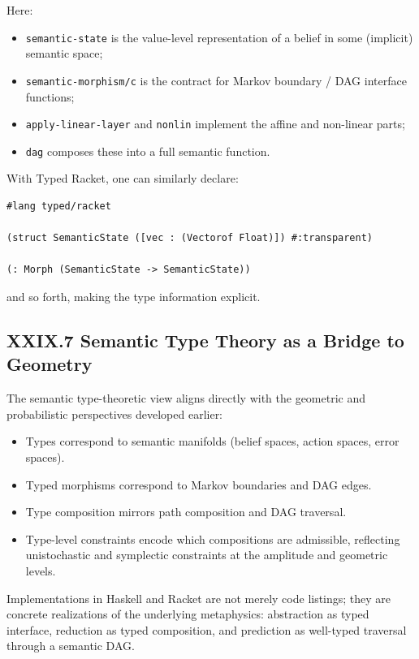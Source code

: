 \documentclass[12pt,letterpaper]{article}
\begin{document}
Here:

\begin{itemize}
  \item \verb|semantic-state| is the value-level representation of a belief in some (implicit) semantic space;
  \item \verb|semantic-morphism/c| is the contract for Markov boundary / DAG interface functions;
  \item \verb|apply-linear-layer| and \verb|nonlin| implement the affine and non-linear parts;
  \item \verb|dag| composes these into a full semantic function.
\end{itemize}

With Typed Racket, one can similarly declare:

\begin{verbatim}
#lang typed/racket

(struct SemanticState ([vec : (Vectorof Float)]) #:transparent)

(: Morph (SemanticState -> SemanticState))
\end{verbatim}

and so forth, making the type information explicit.

\subsection{XXIX.7 Semantic Type Theory as a Bridge to Geometry}

The semantic type-theoretic view aligns directly with the geometric and probabilistic perspectives developed earlier:

\begin{itemize}
  \item Types correspond to semantic manifolds (belief spaces, action spaces, error spaces).
  \item Typed morphisms correspond to Markov boundaries and DAG edges.
  \item Type composition mirrors path composition and DAG traversal.
  \item Type-level constraints encode which compositions are admissible, reflecting unistochastic and symplectic constraints at the amplitude and geometric levels.
\end{itemize}

Implementations in Haskell and Racket are not merely code listings; they are concrete realizations of the underlying metaphysics: abstraction as typed interface, reduction as typed composition, and prediction as well-typed traversal through a semantic DAG.
\end{document}
